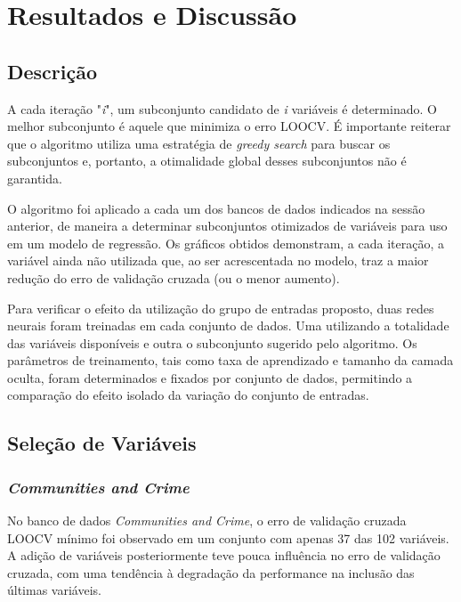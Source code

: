 \chapter[Resultados e Discussão]{Resultados e Discussão}

\section{Descrição}

A cada iteração "\textit{i}", um subconjunto candidato de \textit{i} variáveis é determinado. O melhor subconjunto é aquele que minimiza o erro LOOCV. É importante reiterar que o algoritmo utiliza uma estratégia de \textit{greedy search} para buscar os subconjuntos e, portanto, a otimalidade global desses subconjuntos não é garantida.

O algoritmo foi aplicado a cada um dos bancos de dados indicados na sessão anterior, de maneira a determinar subconjuntos otimizados de variáveis para uso em um modelo de regressão. Os gráficos obtidos demonstram, a cada iteração, a variável ainda não utilizada que, ao ser acrescentada no modelo, traz a maior redução do erro de validação cruzada (ou o menor aumento). 

Para verificar o efeito da utilização do grupo de entradas proposto, duas redes neurais foram treinadas em cada conjunto de dados. Uma utilizando a totalidade das variáveis disponíveis e outra o subconjunto sugerido pelo algoritmo. Os parâmetros de treinamento, tais como taxa de aprendizado e tamanho da camada oculta, foram determinados e fixados por conjunto de dados, permitindo a comparação do efeito isolado da variação do conjunto de entradas.



\section{Seleção de Variáveis}

\subsection{\textit{Communities and Crime}}

No banco de dados \textit{Communities and Crime}, o erro de validação cruzada LOOCV mínimo foi observado em um conjunto com apenas 37 das 102 variáveis. A adição de variáveis posteriormente teve pouca influência no erro de validação cruzada, com uma tendência à degradação da performance na inclusão das últimas variáveis.

